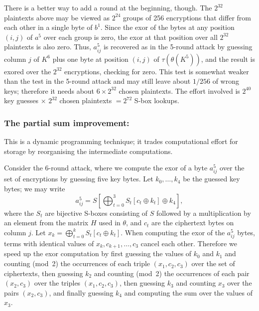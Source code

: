 \documentclass{llncs}
\begin{document}
There is a better way to add a round at the beginning, though.
The $2^{32}$ plaintexts above may be viewed as $2^{24}$ groups of
256 encryptions that differ from each other in a single byte of
$b^1$. Since the exor of the bytes at any position $(i, j)$ of
$a^5$ over each group is zero, the exor at that position over all
$2^{32}$ plaintexts is also zero. Thus, $a^5_{ij}$ is recovered
as in the 5-round attack by guessing column $j$ of $K^6$ plus one
byte at position $(i, j)$ of $\tau(\theta(K^5))$, and the result
is exored over the $2^{32}$ encryptions, checking for zero. This
test is somewhat weaker than the test in the 5-round attack and
may still leave about $1/256$ of wrong keys; therefore it needs
about $6 \times 2^{32}$ chosen plaintexts.
The effort involved is $2^{40}$ key guesses $\times$
$2^{32}$ chosen plaintexts $= 2^{72}$ S-box lookups.


\subsubsection{The partial sum improvement:} This is a dynamic
programming technique; it trades computational effort for storage
by reorganising the intermediate computations.

Consider the 6-round attack, where we compute the exor of a byte
$a^5_{ij}$ over the set of encryptions by guessing five key bytes.
Let $k_0, \dots, k_4$ be the guessed key bytes; we may write
\begin{equation}\label{y-byte}
a^5_{ij} = S[\bigoplus_{t=0}^3{S_t[c_t \oplus k_t]} \oplus k_4],
\end{equation}
where the $S_t$ are bijective S-boxes consisting of $S$ followed
by a multiplication by an element from the matrix $H$ used in
$\theta$, and $c_t$ are the ciphertext bytes on column $j$. Let
$x_k = \bigoplus_{t=0}^k{S_t[c_t \oplus k_t]}$. When computing
the exor of the $a^5_{ij}$ bytes, terms with identical values of
$x_k, c_{k+1}, \dots, c_3$ cancel each other. Therefore we speed
up the exor computation by first guessing the values of $k_0$ and
$k_1$ and counting (mod~2) the occurrences of each triple $(x_1,
c_2, c_3)$ over the set of ciphertexts, then guessing $k_2$ and
counting (mod~2) the occurrences of each pair $(x_2, c_3)$ over
the triples $(x_1, c_2, c_3)$, then guessing $k_3$ and counting
$x_3$ over the pairs $(x_2, c_3)$, and finally guessing $k_4$ and
computing the sum over the values of $x_3$.
\end{document}
